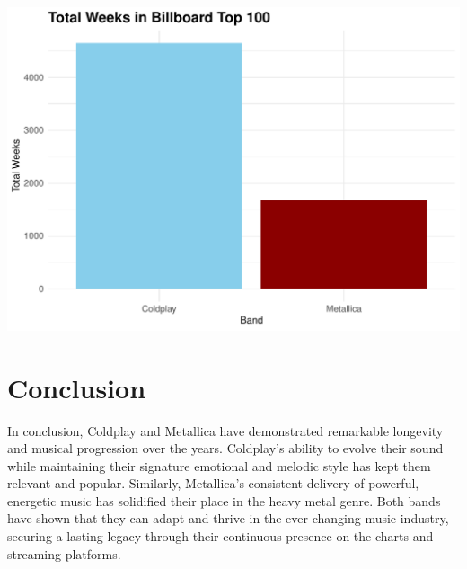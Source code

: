 \documentclass[12pt,preprint, authoryear]{elsarticle}
\let\origfigure\figure
\let\endorigfigure\endfigure
\renewenvironment{figure}[1][2] {
    \expandafter\origfigure\expandafter[H]
} {
    \endorigfigure
}
\numberwithin{equation}{section}
\numberwithin{figure}{section}
\numberwithin{table}{section}
\begin{document}
\begin{figure}

{\centering \includegraphics{README_files/figure-latex/unnamed-chunk-6-1} 

}

\caption{The Billboard 100s Results for both bands\label{Figure6}}\label{fig:unnamed-chunk-6}
\end{figure}

\newpage

\hypertarget{conclusion}{%
\section{Conclusion}\label{conclusion}}

In conclusion, Coldplay and Metallica have demonstrated remarkable
longevity and musical progression over the years. Coldplay's ability to
evolve their sound while maintaining their signature emotional and
melodic style has kept them relevant and popular. Similarly, Metallica's
consistent delivery of powerful, energetic music has solidified their
place in the heavy metal genre. Both bands have shown that they can
adapt and thrive in the ever-changing music industry, securing a lasting
legacy through their continuous presence on the charts and streaming
platforms.


\end{document}

